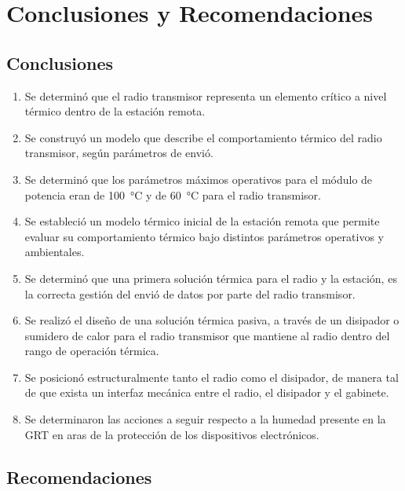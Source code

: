 \chapter{Conclusiones y Recomendaciones}

\section{Conclusiones}
\begin{enumerate}
    \item Se determinó que el radio transmisor representa un elemento crítico a nivel térmico dentro de la estación remota.
    \item Se construyó un modelo que describe el comportamiento  térmico del radio transmisor, según parámetros de envió.
    \item Se determinó que los parámetros máximos operativos para el módulo de potencia eran de \SI{100}{\celsius} y de \SI{60}{\celsius} para el radio transmisor.
    \item Se estableció un modelo térmico inicial de la estación remota que permite evaluar su comportamiento térmico bajo distintos parámetros operativos y ambientales.
    \item Se determinó que una primera solución térmica para el radio y la estación, es la correcta gestión del envió de datos por parte del radio transmisor.
    \item Se realizó el diseño de una solución térmica pasiva, a través de un disipador o sumidero de calor para el radio transmisor que mantiene al radio dentro del rango de operación térmica.
    \item Se posicionó estructuralmente tanto el radio como el disipador, de manera tal de que exista un interfaz mecánica entre el radio, el disipador y el gabinete.
    \item Se determinaron las acciones a seguir respecto a la humedad presente en la GRT en aras de la protección de los dispositivos electrónicos.
\end{enumerate}

\newpage

\section{Recomendaciones}

